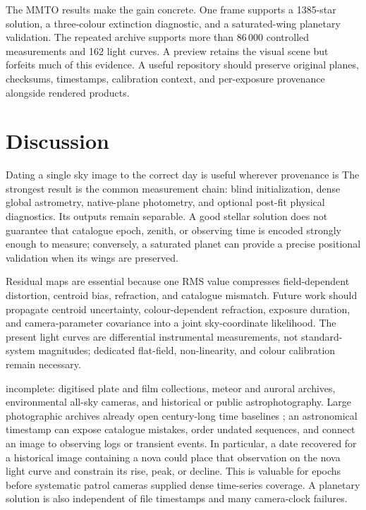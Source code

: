 \documentclass{aa}
\begin{document}
The MMTO results make the gain concrete. One frame supports a 1385-star
solution, a three-colour extinction diagnostic, and a saturated-wing planetary
validation. The repeated archive supports more than 86\,000 controlled
measurements and 162 light curves. A preview retains the visual scene but
forfeits much of this evidence. A useful repository should preserve original
planes, checksums, timestamps, calibration context, and per-exposure
provenance alongside rendered products.

\section{Discussion}
\label{sec:perspectives}

Dating a single sky image to the correct day is useful wherever provenance is
The strongest result is the common measurement chain: blind initialization,
dense global astrometry, native-plane photometry, and optional post-fit
physical diagnostics. Its outputs remain separable. A good stellar solution
does not guarantee that catalogue epoch, zenith, or observing time is encoded
strongly enough to measure; conversely, a saturated planet can provide a
precise positional validation when its wings are preserved.

Residual maps are essential because one RMS value compresses field-dependent
distortion, centroid bias, refraction, and catalogue mismatch. Future work
should propagate centroid uncertainty, colour-dependent refraction, exposure
duration, and camera-parameter covariance into a joint sky-coordinate
likelihood. The present light curves are differential instrumental
measurements, not standard-system magnitudes; dedicated flat-field,
non-linearity, and colour calibration remain necessary.

incomplete: digitised plate and film collections, meteor and auroral archives,
environmental all-sky cameras, and historical or public astrophotography. Large
photographic archives already open century-long time baselines
\citep{Grindlay2009}; an astronomical timestamp can expose catalogue mistakes,
order undated sequences, and connect an image to observing logs or transient
events. In particular, a date recovered for a historical image containing a
nova could place that observation on the nova light curve and constrain its
rise, peak, or decline. This is valuable for epochs before systematic patrol
cameras supplied dense time-series coverage. A planetary solution is also
independent of file timestamps and many camera-clock failures.
\end{document}

